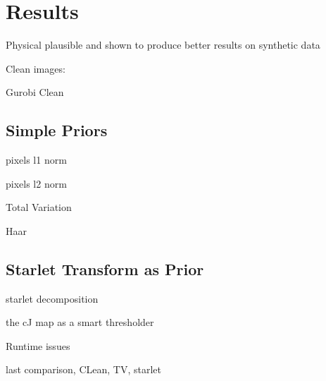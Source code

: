 \section{Results}

Physical plausible and shown to produce better results on synthetic data \cite{mcewen2011compressed}



Clean images:


Gurobi Clean


\subsection{Simple Priors}

pixels l1 norm

pixels l2 norm

Total Variation

Haar 

\subsection{Starlet Transform as Prior}

starlet decomposition

the cJ map as a smart thresholder

Runtime issues


last comparison, CLean, TV, starlet